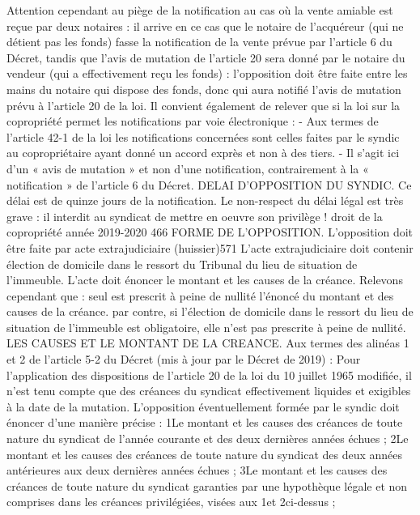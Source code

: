 Attention cependant au piège de la notification au cas où la vente amiable est reçue par deux notaires : il arrive en ce cas que le notaire de l’acquéreur (qui ne détient pas les fonds) fasse la notification de la vente prévue par l’article 6 du Décret, tandis que l’avis de mutation de l’article 20 sera donné par le notaire du vendeur (qui a effectivement reçu les fonds) : l’opposition doit être faite entre les mains du notaire qui dispose des fonds, donc qui aura notifié l’avis de mutation prévu à l’article 20 de la loi.
Il convient également de relever que si la loi sur la copropriété permet les notifications par voie électronique :
- Aux termes de l’article 42-1 de la loi les notifications concernées sont celles faites par le syndic au copropriétaire ayant donné un accord exprès et non à des tiers.
- Il s’agit ici d’un « avis de mutation » et non d’une notification, contrairement à la « notification » de l’article 6 du Décret.
DELAI D'OPPOSITION DU SYNDIC.
Ce délai est de quinze jours de la notification. Le non-respect du délai légal est très grave : il interdit au syndicat de mettre en oeuvre son privilège !
droit de la copropriété année 2019-2020
466
FORME DE L'OPPOSITION.
L'opposition doit être faite par acte extrajudiciaire (huissier)571
L'acte extrajudiciaire doit contenir élection de domicile dans le ressort du Tribunal du lieu de situation de l'immeuble.
L'acte doit énoncer le montant et les causes de la créance.
Relevons cependant que :
seul est prescrit à peine de nullité l'énoncé du montant et des causes de la créance.
par contre, si l'élection de domicile dans le ressort du lieu de situation de l'immeuble est obligatoire, elle n'est pas prescrite à peine de nullité.
LES CAUSES ET LE MONTANT DE LA CREANCE.
Aux termes des alinéas 1 et 2 de l’article 5-2 du Décret (mis à jour par le Décret de 2019) :
Pour l'application des dispositions de l'article 20 de la loi du 10 juillet 1965 modifiée, il n'est tenu compte que des créances du syndicat effectivement liquides et exigibles à la date de la mutation.
L'opposition éventuellement formée par le syndic doit énoncer d'une manière précise :
1\degres Le montant et les causes des créances de toute nature du syndicat de l'année courante et des deux dernières années échues ;
2\degres Le montant et les causes des créances de toute nature du syndicat des deux années antérieures aux deux dernières années échues ;
3\degres Le montant et les causes des créances de toute nature du syndicat garanties par une hypothèque légale et non comprises dans les créances privilégiées, visées aux 1\degres et 2\degres ci-dessus ;
